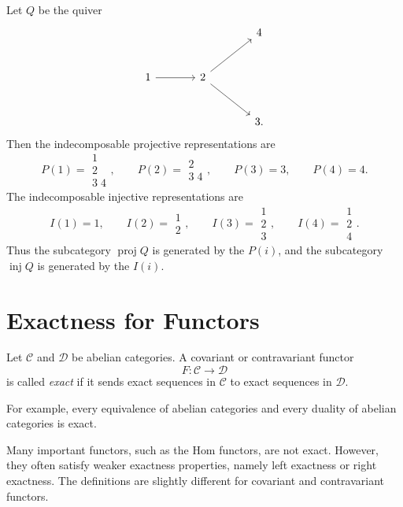 \documentclass[11pt, a4paper]{report}
\begin{document}
\begin{example}
Let \(Q\) be the quiver
\[
\begin{tikzcd}[row sep=large, column sep=large]
& & 4 \\
1 \arrow[r] & 2 \arrow[ur] \arrow[dr] & \\
& & 3 .
\end{tikzcd}
\]
Then the indecomposable projective representations are
\[
P(1)=\substack{1\\2\\3\;4},
\qquad
P(2)=\substack{2\\3\;4},
\qquad
P(3)=3,
\qquad
P(4)=4.
\]
The indecomposable injective representations are
\[
I(1)=1,
\qquad
I(2)=\substack{1\\2},
\qquad
I(3)=\substack{1\\2\\3},
\qquad
I(4)=\substack{1\\2\\4}.
\]
Thus the subcategory \(\operatorname{proj} Q\) is generated by the \(P(i)\), and the
subcategory \(\operatorname{inj} Q\) is generated by the \(I(i)\).
\end{example}

\section{Exactness for Functors}

\begin{definition}
Let \(\mathcal C\) and \(\mathcal D\) be abelian categories. A covariant or
contravariant functor
\[
F:\mathcal C\longrightarrow \mathcal D
\]
is called \emph{exact} if it sends exact sequences in \(\mathcal C\) to exact
sequences in \(\mathcal D\).

For example, every equivalence of abelian categories and every duality of abelian
categories is exact.
\end{definition}

\begin{remark}
Many important functors, such as the Hom functors, are not exact. However, they
often satisfy weaker exactness properties, namely left exactness or right exactness.
The definitions are slightly different for covariant and contravariant functors.
\end{remark}
\end{document}
